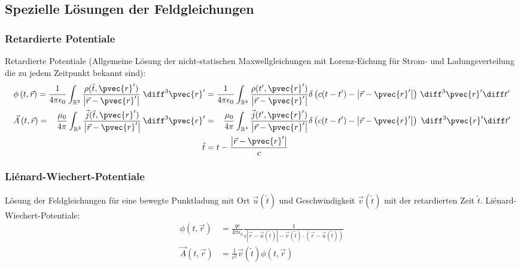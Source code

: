 \documentclass[11pt]{article}
\numberwithin{equation}{section}
\begin{document}
    \subsection{Spezielle Lösungen der Feldgleichungen}

      \subsubsection{Retardierte Potentiale}
        Retardierte Potentiale (Allgemeine Lösung der nicht-statischen Maxwellgleichungen mit Lorenz-Eichung für Strom- und Ladungsverteilung die zu jedem Zeitpunkt bekannt sind):
        \begin{equation}
          \begin{aligned}
            \phi\left(t,\vec{r}\right)
            = \frac{1}{4\pi\epsilon_0} \int_{\mathbb{R}^3} \frac{\rho(\tilde{t},\pvec{r}')}{\left|\vec{r}-\pvec{r}'\right|}\;\diff^3 \pvec{r}'
            &=  \frac{1}{4\pi\epsilon_0} \int_{\mathbb{R}^4} \frac{\rho(t',\pvec{r}')}{\left|\vec{r}-\pvec{r}'\right|}\delta\left( c(t-t')-\left|\vec{r}-\pvec{r}'\right|\right)\,\diff^3 \pvec{r}'\diff t' \\
            \vec{A}\left(t,\vec{r}\right)
            = \phantom{\epsilon_0} \frac{\mu_0}{4\pi} \int_{\mathbb{R}^3} \frac{\vec{j}(\tilde{t},\pvec{r}')}{\left|\vec{r}-\pvec{r}'\right|}\,\diff^3 \pvec{r}'
            &=  \phantom{\epsilon_0} \frac{\mu_0}{4\pi} \int_{\mathbb{R}^4} \frac{\vec{j}(t',\pvec{r}')}{\left|\vec{r}-\pvec{r}'\right|}\delta\left( c(t-t')-\left|\vec{r}-\pvec{r}'\right|\right)\;\diff^3 \pvec{r}'\diff t' \\
            \tilde{t}&=t-\frac{\left|\vec{r}-\pvec{r}'\right|}{c}
          \end{aligned}
        \end{equation}

      \subsubsection{Liénard-Wiechert-Potentiale}

        Lösung der Feldgleichungen für eine bewegte Punktladung mit Ort $\vec{u}(\tilde{t})$ und Geschwindigkeit $\vec{v}(\tilde{t})$ mit der retardierten Zeit $\tilde{t}$. Liénard-Wiechert-Potentiale:
        \begin{equation}
          \begin{aligned}
            \phi(t,\vec{r}) & =\frac{q c}{4\pi \epsilon_0}\frac{1}{c \left|\vec{r}-\vec{u}(\tilde{t})\right|-\vec{v}(\tilde{t})\cdot\left(\vec{r}-\vec{u}(\tilde{t})\right)} \\
            \vec{A}(t,\vec{r}) &= \frac{1}{c^2}\vec{v}(\tilde{t})\phi(t,\vec{r}) \\
          \end{aligned}
        \end{equation}
\end{document}
